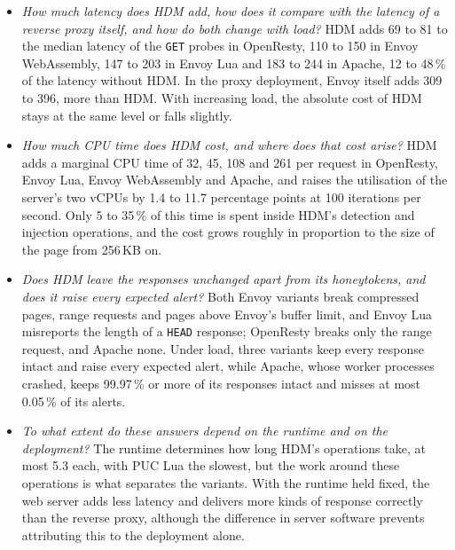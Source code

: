\documentclass{rptuma}
\begin{document}
\begin{itemize}[leftmargin=3.2em,labelwidth=2.6em,labelsep=0.6em]
  \item[\textbf{RQ1}] \emph{How much latency does HDM add, how does it compare with the latency of a reverse proxy itself, and how do both change with load?}\newline
    HDM adds 69 to 81\us{} to the median latency of the \texttt{GET} probes in
    OpenResty, 110 to 150\us{} in Envoy WebAssembly, 147 to 203\us{} in Envoy Lua and 183 to
    244\us{} in Apache, 12 to 48\,\% of the latency without HDM. In the proxy deployment, Envoy
    itself adds 309 to 396\us, more than HDM. With increasing load, the absolute cost of HDM stays
    at the same level or falls slightly.
  \item[\textbf{RQ2}] \emph{How much CPU time does HDM cost, and where does that cost arise?}\newline
    HDM adds a marginal CPU time of 32, 45, 108 and 261\us{} per request in
    OpenResty, Envoy Lua, Envoy WebAssembly and Apache, and raises the utilisation of the server's
    two vCPUs by 1.4 to 11.7 percentage points at 100 iterations per second. Only 5 to 35\,\% of
    this time is spent inside HDM's detection and injection operations, and the cost grows roughly
    in proportion to the size of the page from 256\,KB on.
  \item[\textbf{RQ3}] \emph{Does HDM leave the responses unchanged apart from its honeytokens, and does it raise every expected alert?}\newline
    Both Envoy variants break compressed pages, range requests and pages above
    Envoy's buffer limit, and Envoy Lua misreports the length of a \texttt{HEAD} response; OpenResty
    breaks only the range request, and Apache none. Under load, three variants keep every response
    intact and raise every expected alert, while Apache, whose worker processes crashed, keeps
    99.97\,\% or more of its responses intact and misses at most 0.05\,\% of its alerts.
  \item[\textbf{RQ4}] \emph{To what extent do these answers depend on the runtime and on the deployment?}\newline
    The runtime determines how long HDM's operations take, at most 5.3\us{} each,
    with PUC Lua the slowest, but the work around these operations is what separates the variants.
    With the runtime held fixed, the web server adds less latency and delivers more kinds of
    response correctly than the reverse proxy, although the difference in server software prevents
    attributing this to the deployment alone.
\end{itemize}
\end{document}
